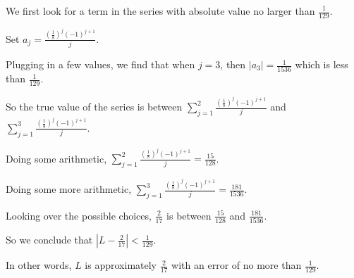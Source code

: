 \documentclass{ximera}
\begin{document}
\begin{question}
  \begin{solution}
    \begin{hint}
      We first look for a term in the series with absolute value no larger than \(\displaystyle\frac{1}{129}\).
    \end{hint}
    \begin{hint}
      Set \(a_{j} = \displaystyle\frac{\left(\displaystyle\frac{1}{8}\right)^{j} \left(-1\right)^{j + 1}}{j}\).
    \end{hint}
    \begin{hint}
      Plugging in a few values, we find that when \(j = 3\), then \(|a_{3}| = \displaystyle\frac{1}{1536}\) which is less than \(\displaystyle\frac{1}{129}\).
    \end{hint}
    \begin{hint}
      So the true value of the series is between \(\displaystyle\sum_{j = 1}^{2} \displaystyle\frac{\left(\displaystyle\frac{1}{8}\right)^{j} \left(-1\right)^{j + 1}}{j}\) and \(\displaystyle\sum_{j = 1}^{3} \displaystyle\frac{\left(\displaystyle\frac{1}{8}\right)^{j} \left(-1\right)^{j + 1}}{j}\).
    \end{hint}
    \begin{hint}
      Doing some arithmetic, \(\displaystyle\sum_{j = 1}^{2} \displaystyle\frac{\left(\displaystyle\frac{1}{8}\right)^{j} \left(-1\right)^{j + 1}}{j} = \displaystyle\frac{15}{128}\).
    \end{hint}
    \begin{hint}
      Doing some more arithmetic, \(\displaystyle\sum_{j = 1}^{3} \displaystyle\frac{\left(\displaystyle\frac{1}{8}\right)^{j} \left(-1\right)^{j + 1}}{j} = \displaystyle\frac{181}{1536}\).
    \end{hint}
    \begin{hint}
      Looking over the possible choices, \(\displaystyle\frac{2}{17}\) is between \(\displaystyle\frac{15}{128}\) and \(\displaystyle\frac{181}{1536}\).
    \end{hint}
    \begin{hint}
      So we conclude that \(\left| L - \displaystyle\frac{2}{17} \right| < \displaystyle\frac{1}{129}\).
    \end{hint}
    \begin{hint}
      In other words, \(L\) is approximately \(\displaystyle\frac{2}{17}\) with an error of no more than \(\displaystyle\frac{1}{129}\).
    \end{hint}
    
    \begin{multiple-choice}
      
    \end{multiple-choice}
    
  \end{solution}
\end{question}
\end{document}
